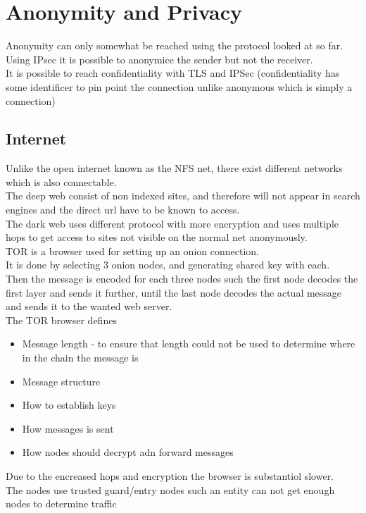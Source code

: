 \documentclass[12pt, a4paper]{article}
\begin{document}
	\section{Anonymity and Privacy}
		Anonymity can only somewhat be reached using the protocol looked at so far.\\
		Using IPsec it is possible to anonymice the sender but not the receiver.\\
		It is possible to reach confidentiality with TLS and IPSec (confidentiality has some identificer to pin point the connection unlike anonymous which is simply a connection)\\
		\subsection{Internet}
			Unlike the open internet known as the NFS net, there exist different networks which is also connectable.\\
			The deep web consist of non indexed sites, and therefore will not appear in search engines and the direct url have to be known to access.\\
			The dark web uses different protocol with more encryption and uses multiple hops to get access to sites  not visible on the normal net anonymously.\\
			TOR is a browser used for setting up an onion connection.\\
			It is done by selecting 3 onion nodes, and generating shared key with each.\\
			Then the message is encoded for each three nodes such the first node decodes the first layer and sends it further, until the last node decodes the actual message and sends it to the wanted web server.\\
			The TOR browser defines
			\begin{itemize}
				\item Message length - to ensure that length could not be used to determine where in the chain the message is
				\item Message structure
				\item How to establish keys
				\item How messages is sent
				\item How nodes should decrypt adn forward messages
			\end{itemize}
			Due to the encreased hops and encryption the browser is substantiol slower.\\
			The nodes use trusted guard/entry nodes such an entity can not get enough nodes to determine traffic
\end{document}
